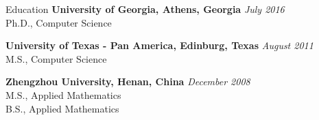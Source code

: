 \documentclass{resume} %
\begin{document}

\begin{rSection}{Education}
{\bf University of Georgia, Athens, Georgia} \hfill {\em July 2016} \\ 
Ph.D., Computer Science

{\bf University of Texas - Pan America, Edinburg, Texas} \hfill {\em August 2011} \\ 
M.S., Computer Science

{\bf Zhengzhou University, Henan, China} \hfill {\em December 2008} \\ 
M.S., Applied Mathematics\\
B.S., Applied Mathematics
\end{rSection}

\end{document}
